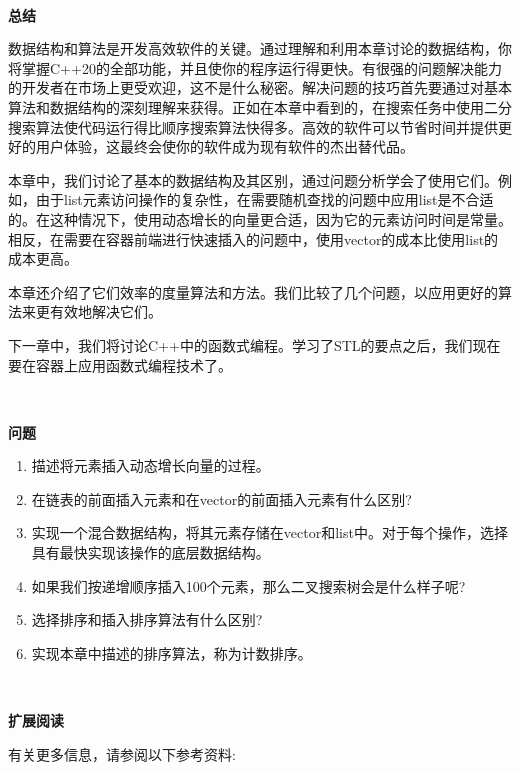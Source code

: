 \noindent\textbf{}\ \par
\textbf{总结} \ \par
数据结构和算法是开发高效软件的关键。通过理解和利用本章讨论的数据结构，你将掌握C++20的全部功能，并且使你的程序运行得更快。有很强的问题解决能力的开发者在市场上更受欢迎，这不是什么秘密。解决问题的技巧首先要通过对基本算法和数据结构的深刻理解来获得。正如在本章中看到的，在搜索任务中使用二分搜索算法使代码运行得比顺序搜索算法快得多。高效的软件可以节省时间并提供更好的用户体验，这最终会使你的软件成为现有软件的杰出替代品。 \par
本章中，我们讨论了基本的数据结构及其区别，通过问题分析学会了使用它们。例如，由于list元素访问操作的复杂性，在需要随机查找的问题中应用list是不合适的。在这种情况下，使用动态增长的向量更合适，因为它的元素访问时间是常量。相反，在需要在容器前端进行快速插入的问题中，使用vector的成本比使用list的成本更高。 \par
本章还介绍了它们效率的度量算法和方法。我们比较了几个问题，以应用更好的算法来更有效地解决它们。 \par
下一章中，我们将讨论C++中的函数式编程。学习了STL的要点之后，我们现在要在容器上应用函数式编程技术了。 \par

\noindent\textbf{}\ \par
\textbf{问题} \ \par
\begin{enumerate}
	\item 描述将元素插入动态增长向量的过程。
	\item 在链表的前面插入元素和在vector的前面插入元素有什么区别?
	\item 实现一个混合数据结构，将其元素存储在vector和list中。对于每个操作，选择具有最快实现该操作的底层数据结构。
	\item 如果我们按递增顺序插入100个元素，那么二叉搜索树会是什么样子呢?
	\item 选择排序和插入排序算法有什么区别?
	\item 实现本章中描述的排序算法，称为计数排序。
\end{enumerate}

\noindent\textbf{}\ \par
\textbf{扩展阅读} \ \par
有关更多信息，请参阅以下参考资料: \par

